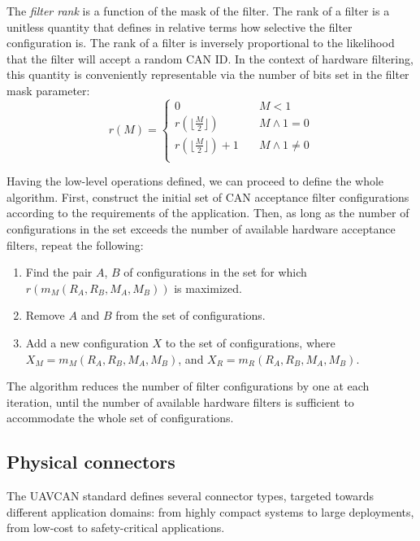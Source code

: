 The \emph{filter rank} is a function of the mask of the filter.
The rank of a filter is a unitless quantity that defines in relative terms how selective the filter configuration is.
The rank of a filter is inversely proportional to the likelihood that the filter will accept a random CAN ID.
In the context of hardware filtering, this quantity is conveniently representable via the number of bits set in
the filter mask parameter:
\begin{equation*}
r(M) =
\begin{cases}
    0                                   & \quad M < 1 \\
    r(\lfloor\frac{M}{2}\rfloor)        & \quad M \land 1 = 0 \\
    r(\lfloor\frac{M}{2}\rfloor) + 1    & \quad M \land 1 \neq 0 \\
\end{cases}
\end{equation*}

Having the low-level operations defined, we can proceed to define the whole algorithm.
First, construct the initial set of CAN acceptance filter configurations
according to the requirements of the application.
Then, as long as the number of configurations in the set exceeds the number of available hardware acceptance filters,
repeat the following:
\begin{enumerate}
    \item Find the pair $A$, $B$ of configurations in the set for which $r(m_M(R_A, R_B, M_A, M_B))$ is maximized.
    \item Remove $A$ and $B$ from the set of configurations.
    \item Add a new configuration $X$ to the set of configurations, where
    $X_M = m_M(R_A, R_B, M_A, M_B)$, and $X_R = m_R(R_A, R_B, M_A, M_B)$.
\end{enumerate}

The algorithm reduces the number of filter configurations by one at each iteration,
until the number of available hardware filters is sufficient to accommodate the whole set of configurations.

\subsection{Physical connectors}

The UAVCAN standard defines several connector types, targeted towards different application domains:
from highly compact systems to large deployments, from low-cost to safety-critical applications.

